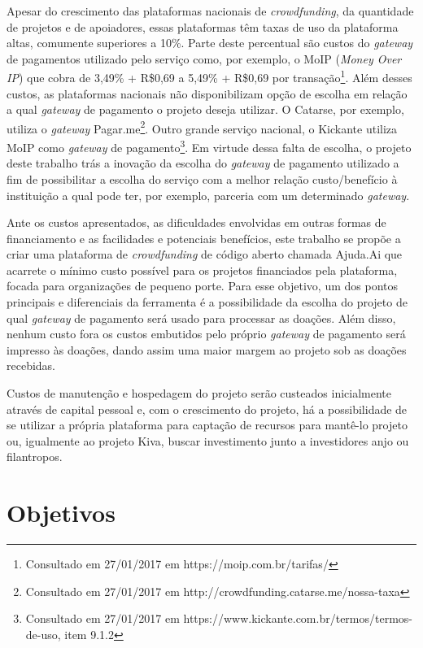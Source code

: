 Apesar do crescimento das plataformas nacionais de \emph{crowdfunding}, da quantidade de projetos e de apoiadores, essas plataformas têm taxas de uso da plataforma altas, comumente superiores a 10\%. Parte deste percentual são custos do \emph{gateway} de pagamentos utilizado pelo serviço como, por exemplo, o MoIP (\emph{Money Over IP}) que cobra de 3,49\% + R\$0,69 a 5,49\% + R\$0,69 por transação\footnote{Consultado em 27/01/2017 em https://moip.com.br/tarifas/}. Além desses custos, as plataformas nacionais não disponibilizam opção de escolha em relação a qual \emph{gateway} de pagamento o projeto deseja utilizar. O Catarse, por exemplo, utiliza o \emph{gateway} Pagar.me\footnote{Consultado em 27/01/2017 em http://crowdfunding.catarse.me/nossa-taxa}. Outro grande serviço nacional, o Kickante utiliza MoIP como \emph{gateway} de pagamento\footnote{Consultado em 27/01/2017 em https://www.kickante.com.br/termos/termos-de-uso, item 9.1.2}. Em virtude dessa falta de escolha, o projeto deste trabalho trás a inovação da escolha do \emph{gateway} de pagamento utilizado a fim de possibilitar a escolha do serviço com a melhor relação custo/benefício à instituição a qual pode ter, por exemplo, parceria com um determinado \emph{gateway}.

Ante os custos apresentados, as dificuldades envolvidas em outras formas de financiamento e as facilidades e potenciais benefícios, este trabalho se propõe a criar uma plataforma de \emph{crowdfunding} de código aberto chamada Ajuda.Ai que acarrete o mínimo custo possível para os projetos financiados pela plataforma, focada para organizações de pequeno porte. Para esse objetivo, um dos pontos principais e diferenciais da ferramenta é a possibilidade da escolha do projeto de qual \emph{gateway} de pagamento será usado para processar as doações. Além disso, nenhum custo fora os custos embutidos pelo próprio \emph{gateway} de pagamento será impresso às doações, dando assim uma maior margem ao projeto sob as doações recebidas.

Custos de manutenção e hospedagem do projeto serão custeados inicialmente através de capital pessoal e, com o crescimento do projeto, há a possibilidade de se utilizar a própria plataforma para captação de recursos para mantê-lo projeto ou, igualmente ao projeto Kiva, buscar investimento junto a investidores anjo ou filantropos.



\section{Objetivos}
